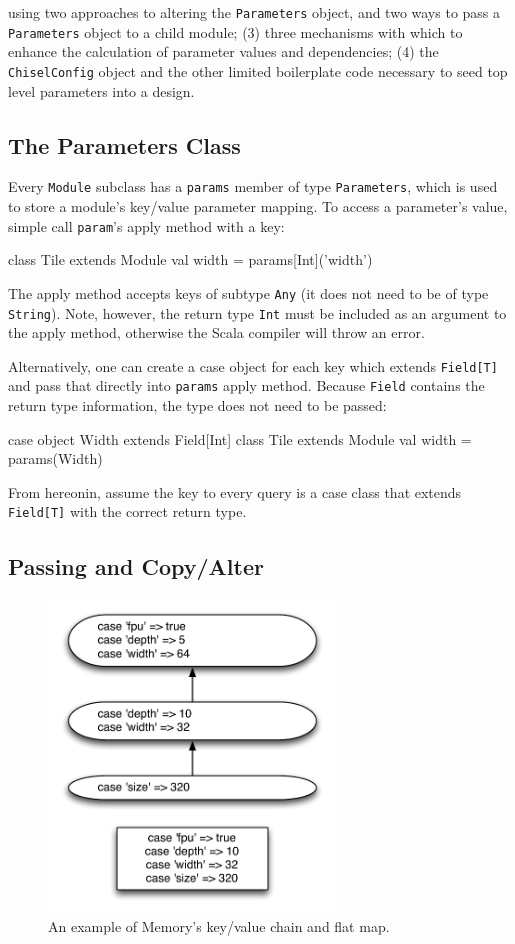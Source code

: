 \documentclass[10pt,twocolumn]{article}
\def\code#1{{\small\tt #1}}
\begin{document}
using two approaches to altering the \code{Parameters} object, and two ways to pass a \code{Parameters} object to a child module; (3) three mechanisms with which to enhance the calculation of parameter values and dependencies; (4) the \code{ChiselConfig} object and the other limited boilerplate code necessary to seed top level parameters into a design.

\subsection{The Parameters Class}
Every \code{Module} subclass has a \code{params} member of type \code{Parameters}, which is used to store a module's key/value parameter mapping. To access a parameter's value, simple call \code{param}'s apply method with a key:
\begin{scala}
class Tile extends Module { 
  val width = params[Int]('width') 
}
\end{scala}
The apply method accepts keys of subtype \code{Any} (it does not need to be of type \code{String}). Note, however, the return type \code{Int} must be included as an argument to the apply method, otherwise the Scala compiler will throw an error.

Alternatively, one can create a case object for each key which extends \code{Field[T]} and pass that directly into \code{params} apply method. Because \code{Field} contains the return type information, the type does not need to be passed:

\begin{scala}
case object Width extends Field[Int]
class Tile extends Module { 
  val width = params(Width) 
}
\end{scala}

From hereonin, assume the key to every query is a case class that extends \code{Field[T]} with the correct return type.

\subsection{Passing and Copy/Alter}

\begin{figure}[h]
\centering
\includegraphics[width=3in]{figs/alter}
\caption{An example of Memory's key/value chain and flat map.}
\label{fig:alter}
\end{figure}
\end{document}

